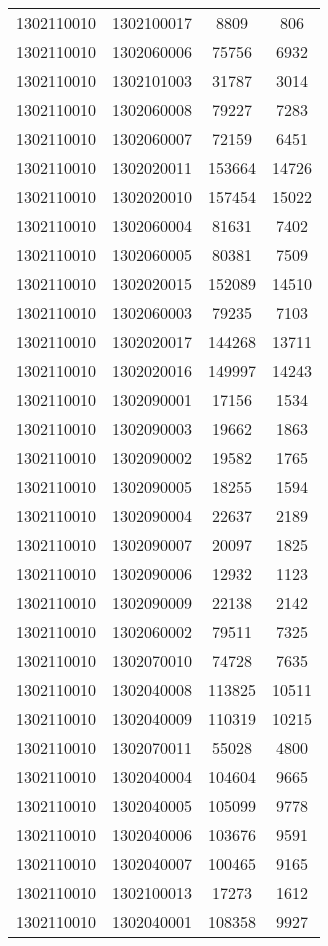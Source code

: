 \begin{longtable}{llcc}
1302110010 & 1302100017 & 8809 & 806\\
1302110010 & 1302060006 & 75756 & 6932\\
1302110010 & 1302101003 & 31787 & 3014\\
1302110010 & 1302060008 & 79227 & 7283\\
1302110010 & 1302060007 & 72159 & 6451\\
1302110010 & 1302020011 & 153664 & 14726\\
1302110010 & 1302020010 & 157454 & 15022\\
1302110010 & 1302060004 & 81631 & 7402\\
1302110010 & 1302060005 & 80381 & 7509\\
1302110010 & 1302020015 & 152089 & 14510\\
1302110010 & 1302060003 & 79235 & 7103\\
1302110010 & 1302020017 & 144268 & 13711\\
1302110010 & 1302020016 & 149997 & 14243\\
1302110010 & 1302090001 & 17156 & 1534\\
1302110010 & 1302090003 & 19662 & 1863\\
1302110010 & 1302090002 & 19582 & 1765\\
1302110010 & 1302090005 & 18255 & 1594\\
1302110010 & 1302090004 & 22637 & 2189\\
1302110010 & 1302090007 & 20097 & 1825\\
1302110010 & 1302090006 & 12932 & 1123\\
1302110010 & 1302090009 & 22138 & 2142\\
1302110010 & 1302060002 & 79511 & 7325\\
1302110010 & 1302070010 & 74728 & 7635\\
1302110010 & 1302040008 & 113825 & 10511\\
1302110010 & 1302040009 & 110319 & 10215\\
1302110010 & 1302070011 & 55028 & 4800\\
1302110010 & 1302040004 & 104604 & 9665\\
1302110010 & 1302040005 & 105099 & 9778\\
1302110010 & 1302040006 & 103676 & 9591\\
1302110010 & 1302040007 & 100465 & 9165\\
1302110010 & 1302100013 & 17273 & 1612\\
1302110010 & 1302040001 & 108358 & 9927\\

\end{longtable}
